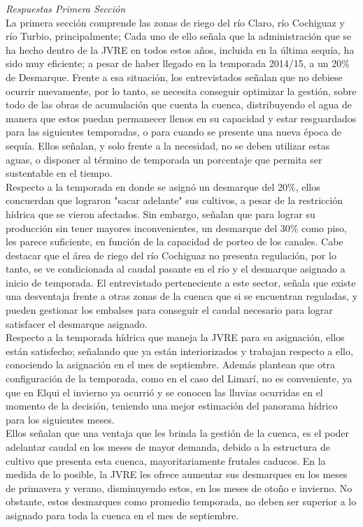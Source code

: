 \documentclass[11pt,]{article}
\begin{document}
\textit {Respuestas Primera Sección}\\

La primera sección comprende las zonas de riego del río Claro, río Cochiguaz y río Turbio, principalmente; Cada uno de ello señala que la administración que se ha hecho dentro de la JVRE en todos estos años, incluida en la última sequía, ha sido muy eficiente; a pesar de haber llegado en la temporada 2014/15, a un 20\% de Desmarque. Frente a esa situación, los entrevistados señalan que no debiese ocurrir nuevamente, por lo tanto, se necesita conseguir optimizar la gestión, sobre todo de las obras de acumulación que cuenta la cuenca, distribuyendo el agua de manera que estos puedan permanecer llenos en su capacidad y estar resguardados para las siguientes temporadas, o para cuando se presente una nueva época de sequía. Ellos señalan, y solo frente a la necesidad, no se deben utilizar estas aguas, o disponer al término de temporada un porcentaje que permita ser sustentable en el tiempo.\\

Respecto a la temporada en donde se asignó un desmarque del 20\%, ellos concuerdan que lograron "sacar adelante" sus cultivos, a pesar de la restricción hídrica que se vieron afectados. Sin embargo, señalan que para lograr su producción sin tener mayores inconvenientes, un desmarque del 30\% como piso, les parece suficiente, en función de la capacidad de porteo de los canales. Cabe destacar que el área de riego del río Cochiguaz no presenta regulación, por lo tanto, se ve condicionada al caudal pasante en el río y el desmarque asignado a inicio de temporada. El entrevistado perteneciente a este sector, señala que existe una desventaja frente a otras zonas de la cuenca que si se encuentran reguladas, y pueden gestionar los embalses para conseguir el caudal necesario para lograr satisfacer el desmarque asignado. \\
 
Respecto a la temporada hídrica que maneja la JVRE para su asignación, ellos están satisfecho; señalando que ya están interiorizados y trabajan respecto a ello, conociendo la asignación en el mes de septiembre. Además plantean que otra configuración de la temporada, como en el caso del Limarí, no es conveniente, ya que en Elqui el invierno ya ocurrió y se conocen las lluvias ocurridas en el momento de la decisión, teniendo una mejor estimación del panorama hídrico para los siguientes meses.  \\

Ellos señalan que una ventaja que les brinda la gestión de la cuenca, es el poder adelantar caudal en los meses de mayor demanda, debido a la estructura de cultivo que presenta esta cuenca, mayoritariamente frutales caducos. En la medida de lo posible, la JVRE les ofrece aumentar sus desmarques en los meses de primavera y verano, disminuyendo estos, en los meses de otoño e invierno. No obstante, estos desmarques como promedio temporada, no deben ser superior a lo asignado para toda la cuenca en el mes de septiembre.  \\
\end{document}
